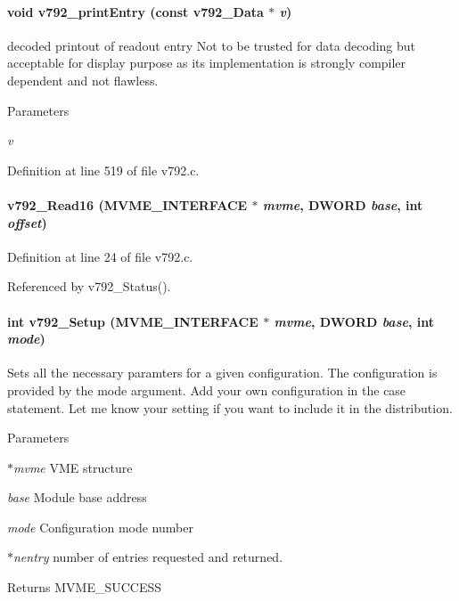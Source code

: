 \paragraph[{v792\_\-printEntry}]{\setlength{\rightskip}{0pt plus 5cm}void v792\_\-printEntry (const {\bf v792\_\-Data} $\ast$ {\em v})}\hfill\label{v792_8h_a24de5c4823e19a5361b4fd5fe4f1f087}
decoded printout of readout entry Not to be trusted for data decoding but acceptable for display purpose as its implementation is strongly compiler dependent and not flawless. 
\begin{DoxyParams}{Parameters}
\item[{\em v}]\end{DoxyParams}


Definition at line 519 of file v792.c.
\paragraph[{v792\_\-Read16}]{ v792\_\-Read16 ({\bf MVME\_\-INTERFACE} $\ast$ {\em mvme}, \/  {\bf DWORD} {\em base}, \/  int {\em offset})}\hfill\label{v792_8h_a2da00222f79ec8c939c45c45ca1a4998}


Definition at line 24 of file v792.c.

Referenced by v792\_\-Status().
\paragraph[{v792\_\-Setup}]{\setlength{\rightskip}{0pt plus 5cm}int v792\_\-Setup ({\bf MVME\_\-INTERFACE} $\ast$ {\em mvme}, \/  {\bf DWORD} {\em base}, \/  int {\em mode})}\hfill\label{v792_8h_ab1fa02b31b58838414803d8d750dbaa3}
Sets all the necessary paramters for a given configuration. The configuration is provided by the mode argument. Add your own configuration in the case statement. Let me know your setting if you want to include it in the distribution. 
\begin{DoxyParams}{Parameters}
\item[{\em $\ast$mvme}]VME structure \item[{\em base}]Module base address \item[{\em mode}]Configuration mode number \item[{\em $\ast$nentry}]number of entries requested and returned. \end{DoxyParams}
\begin{DoxyReturn}{Returns}
MVME\_\-SUCCESS 
\end{DoxyReturn}


